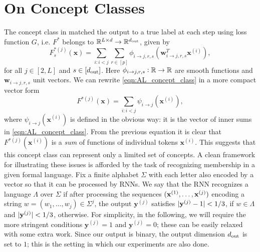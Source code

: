 \section{On Concept Classes}\label{sec:diff}
    The concept class in \cite{allen2019can} matched the output to a true label at each step using loss function $G$, i.e. $F^{\ast}$ belongs to $\mathbb{R}^{ L \times d} \to \mathbb{R}^{d_{\mathrm{out}}}$, given by
    \begin{equation} \label{eqn:AL_concept_class}
    F^{\ast (j)}_s\left(\mathbf{x}\right) = \sum_{i : i < j} \sum_{r \in [p]} \phi_{i \to j, r, s} (\mathbf{w}_{i \to j, r, s}^T \mathbf{x}^{(i)}), 
    \end{equation}
    for all $j \in [2, L]$ and $s \in [d_{\mathrm{out}} ]$. Here $\phi_{i \to j, r, s}: \mathbb{R} \to \mathbb{R}$ are smooth functions and $\mathbf{w}_{i \to j, r, s}$ unit vectors. We can rewrite \eqref{eqn:AL_concept_class} in a more compact vector form
    \begin{equation} \label{eqn:AL_concept_class_simplified}
        F^{\ast (j)}\left(\mathbf{x}\right) =  \sum_{i : i < j} \psi_{i \to j}(\mathbf{x}^{(i)}),
    \end{equation}
where $\psi_{i \to j}(\mathbf{x}^{(i)})$ is defined in the obvious way: it is the vector of inner sums in \eqref{eqn:AL_concept_class}.
 From the previous equation it is clear that $F^{\ast (j)}(\mathbf{x}^{(i)})$ is a \emph{sum} of 
functions of individual tokens $\mathbf{x}^{(i)}$. This suggests that this concept class can represent only a limited set of concepts. A clean framework for illustrating these issues is afforded by the task of recognizing membership in a given formal language. Fix a finite alphabet $\Sigma$ with each letter also encoded by a vector so that it can be processed by RNNs. We say that the RNN recognizes a language $\Lambda$ over $\Sigma$ if after processing the sequences $(\mathbf{x}^{(1)}, \ldots, \mathbf{x}^{(j)})$ encoding a string $w = (w_1, \ldots, w_j) \in \Sigma^j$, the output $\mathbf{y}^{(j)}$ satisfies $\abs[0]{\mathbf{y}^{(j)}-1}<1/3$, if $w \in \Lambda$ and $\abs[0]{\mathbf{y}^{(j)}}<1/3$, otherwise. For simplicity, in the following, we will require the more stringent conditions $\mathbf{y}^{(j)}=1$ and  $\mathbf{y}^{(j)}=0$; these can be easily relaxed with some extra work. Since our output is binary, the output dimension $d_{\mathrm{out}} $ is set to $1$; this is the setting in which our experiments are also done.

